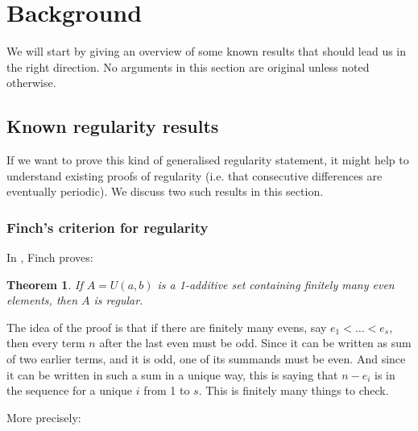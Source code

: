 \documentclass{article}
\newtheorem{theorem}{Theorem}[section]
\theoremstyle{definition}
\theoremstyle{remark}
\numberwithin{equation}{section}
\begin{document}
\section{Background}

We will start by giving an overview of some known results that should
lead us in the right direction.  No arguments in this section are
original unless noted otherwise.

\subsection{Known regularity results}

If we want to prove this kind of generalised regularity statement, it
might help to understand existing proofs of regularity (i.e. that
consecutive differences are eventually periodic).  We discuss two such
results in this section.

\subsubsection{Finch's criterion for regularity}

In \cite{regularity_criterion_finch}, Finch proves:

\begin{theorem}
If $A = U(a,b)$ is a 1-additive set containing finitely many even
elements, then $A$ is regular.  
\end{theorem}

The idea of the proof is that if there are finitely many evens, say
$e_1 < \ldots < e_s$, then every term $n$ after the last even must be
odd.  Since it can be written as sum of two earlier terms, and it is
odd, one of its summands must be even.  And since it can be written in
such a sum in a unique way, this is saying that $n - e_i$ is in the
sequence for a unique $i$ from 1 to $s$.  This is finitely many things
to check.

More precisely:
\end{document}
